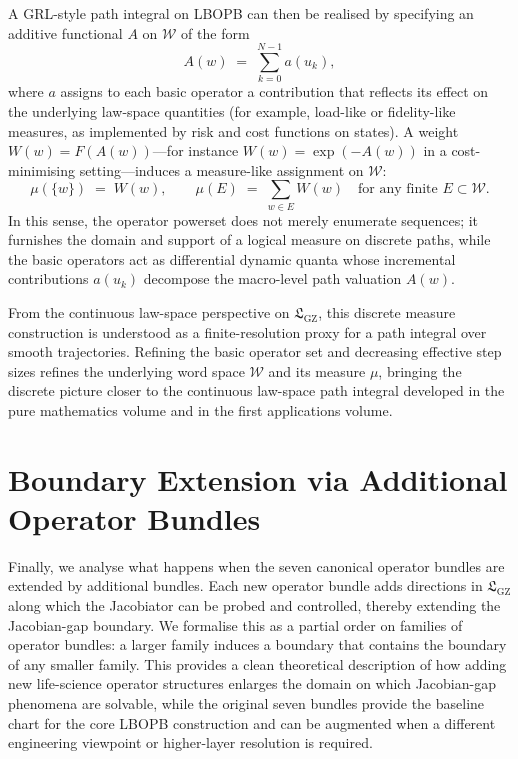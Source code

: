 \documentclass[11pt]{book}
\theoremstyle{plain}
\theoremstyle{definition}
\theoremstyle{remark}
\newcommand{\GZLS}{\ensuremath{\mathfrak{L}_{\mathrm{GZ}}}}       \newcommand{\GZLT}{\ensuremath{M_{!w}}}                           \newcommand{\GZLOC}{\ensuremath{A_M}}                             \newcommand{\GZLCurv}{\ensuremath{\mathcal{F}_{\mathrm{law}}}}
\begin{document}
A GRL-style path integral on LBOPB can then be realised by specifying
an additive functional $A$ on $\mathcal{W}$ of the form
\[
  A(w) \;=\; \sum_{k=0}^{N-1} a(u_{k}),
\]
where $a$ assigns to each basic operator a contribution that reflects
its effect on the underlying law-space quantities (for example,
load-like or fidelity-like measures, as implemented by risk and cost
functions on states). A weight
$W(w) = F(A(w))$—for instance $W(w) = \exp(-A(w))$ in a
cost-minimising setting—induces a measure-like assignment on
$\mathcal{W}$:
\[
  \mu(\{w\}) \;=\; W(w),
  \qquad
  \mu(E) \;=\; \sum_{w \in E} W(w)
  \quad\text{for any finite } E \subset \mathcal{W}.
\]
In this sense, the operator powerset does not merely enumerate
sequences; it furnishes the domain and support of a logical measure
on discrete paths, while the basic operators act as differential
dynamic quanta whose incremental contributions $a(u_{k})$ decompose
the macro-level path valuation $A(w)$.

From the continuous law-space perspective on $\GZLS$, this discrete
measure construction is understood as a finite-resolution proxy for a
path integral over smooth trajectories. Refining the basic operator
set and decreasing effective step sizes refines the underlying word
space $\mathcal{W}$ and its measure $\mu$, bringing the discrete
picture closer to the continuous law-space path integral developed in
the pure mathematics volume and in the first applications volume.

\section{Boundary Extension via Additional Operator Bundles}


Finally, we analyse what happens when the seven canonical operator
bundles are extended by additional bundles. Each new operator bundle
adds directions in $\GZLS$ along which the Jacobiator can be probed and
controlled, thereby extending the Jacobian-gap boundary. We formalise
this as a partial order on families of operator bundles: a larger family
induces a boundary that contains the boundary of any smaller family.
This provides a clean theoretical description of how adding new
life-science operator structures enlarges the domain on which
Jacobian-gap phenomena are solvable, while the original seven bundles
provide the baseline chart for the core LBOPB construction and can be
augmented when a different engineering viewpoint or higher-layer
resolution is required.
\end{document}

